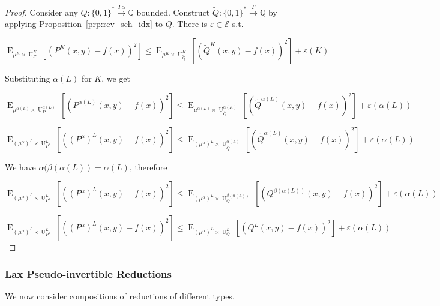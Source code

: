 \documentclass{article}
\numberwithin{equation}{section}
\theoremstyle{definition}
\theoremstyle{plain}
\newcommand{\Bool}{\{0,1\}}
\newcommand{\Words}{{\Bool^*}}
\DeclareMathOperator{\E}{E}
\DeclareMathOperator{\Un}{U}
\newcommand{\Rats}{\mathbb{Q}}
\newcommand{\Fall}{\mathcal{E}}
\newcommand{\Scheme}{\xrightarrow{\Gamma}}
\begin{document}
\begin{proof}

Consider any ${Q: \Words \xrightarrow{\Gamma \alpha} \Rats}$ bounded. Construct ${\tilde{Q}: \Words \Scheme \Rats}$ by applying Proposition~\ref{prp:rev_sch_idx} to ${Q}$. There is ${\varepsilon \in \Fall}$ s.t.

\[\E_{\mu^{K} \times \Un_P^K}[(P^K(x,y)-f(x))^2] \leq \E_{\mu^{K} \times \Un_{\tilde{Q}}^K}[(\tilde{Q}^K(x,y)-f(x))^2] + \varepsilon(K)\]

Substituting ${\alpha(L)}$ for ${K}$, we get

\[\E_{\mu^{\alpha(L)} \times \Un_P^{\alpha(L)}}[(P^{\alpha(L)}(x,y)-f(x))^2] \leq \E_{\mu^{\alpha(L)} \times \Un_{\tilde{Q}}^{\alpha(K)}}[(\tilde{Q}^{\alpha(L)}(x,y)-f(x))^2] + \varepsilon({\alpha(L)})\]

\[\E_{(\mu^\alpha)^{L} \times \Un_{P^\alpha}^L}[((P^\alpha)^L(x,y)-f(x))^2] \leq \E_{(\mu^\alpha)^{L} \times \Un_{\tilde{Q}}^{\alpha(L)}}[(\tilde{Q}^{\alpha(L)}(x,y)-f(x))^2] + \varepsilon(\alpha(L))\]

We have ${\alpha(\beta(\alpha(L))=\alpha(L)}$, therefore

\[\E_{(\mu^\alpha)^{L} \times \Un_{P^\alpha}^L}[((P^\alpha)^L(x,y)-f(x))^2] \leq \E_{(\mu^\alpha)^{L} \times \Un_Q^{\beta(\alpha(L))}}[(Q^{\beta(\alpha(L))}(x,y)-f(x))^2] + \varepsilon(\alpha(L))\]

\[\E_{(\mu^\alpha)^{L} \times \Un_{P^\alpha}^L}[((P^\alpha)^L(x,y)-f(x))^2] \leq \E_{(\mu^\alpha)^{L} \times \Un_Q^L}[(Q^L(x,y)-f(x))^2] + \varepsilon(\alpha(L))\]
%
\end{proof}

\subsubsection{Lax Pseudo-invertible Reductions}

We now consider compositions of reductions of different types.

\end{document}
